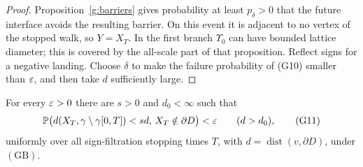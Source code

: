 \begin{proof}
Proposition~\ref{g:barriers} gives probability at least \(p_\delta>0\)
that the future interface avoids the resulting barrier. On this
event it is adjacent to no vertex of the stopped walk, so \(Y=X_T\).
In the first branch \(\Upsilon_0\) can have bounded lattice diameter;
this is covered by the all-scale part of that proposition.
Reflect signs for a negative landing. Choose \(\delta\) to make
the failure probability of (G10) smaller than \(\varepsilon\), and then
take \(d\) sufficiently large.
\end{proof}

\begin{proposition}
\label{g:nonreturn}
For every \(\varepsilon>0\) there are \(s>0\) and \(d_0<\infty\) such that
\[
 \mathbb P\bigl(d(X_T,\gamma\setminus\gamma[0,T])<s d,\,
                  X_T\notin\partial D\bigr)<\varepsilon
 \qquad(d>d_0),                                      \tag{G11}
\]
uniformly over all sign-filtration stopping times \(T\), with
\(d=\operatorname{dist}(v,\partial D)\), under \((\mathrm{GB})\).
\end{proposition}

